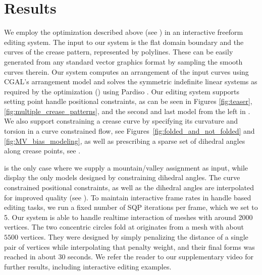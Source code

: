 \section{Results} \label{sec:results}

We employ the optimization described above (see ) in an interactive freeform editing system. The input to our system is the flat domain boundary and the curves of the crease pattern, represented by polylines. These can be easily generated from any standard vector graphics format by sampling the smooth curves therein. Our system computes an arrangement of the input curves using CGAL's arrangement model \cite{cgal,cgal_arr1,cgal_arr2} and solves the symmetric indefinite  linear systems as required by the optimization () using Pardiso \cite{PARDISO1,PARDISO2,PARDISO3}. Our editing system supports setting point handle positional constraints, as can be seen in Figures \ref{fig:teaser}, \ref{fig:multiple_crease_patterns}, and the second and last model from the left in . We also support  constraining a crease curve by specifying its curvature and torsion in a curve constrained flow,  see Figures~\ref{fig:folded_and_not_folded} and \ref{fig:MV_bias_modeling}, as well as prescribing a sparse set of dihedral angles along crease points, see . 

 is the only case where we supply a mountain/valley assignment as input, while  display the only models designed by constraining dihedral angles. The curve constrained positional constraints, as well as the dihedral angles are interpolated for improved quality (see ). To maintain interactive frame rates in handle based editing tasks, we run a fixed number of SQP iterations per frame, which we set to 5. Our system is able to handle realtime interaction of meshes with around 2000 vertices. The two concentric circles fold at  originates from a mesh with about $5500$ vertices. They were designed by simply penalizing the distance of a single pair of vertices while interpolating that penalty weight, and their final forms was reached in about 30 seconds. We refer the reader to our supplementary video for further results, including interactive editing examples. 

